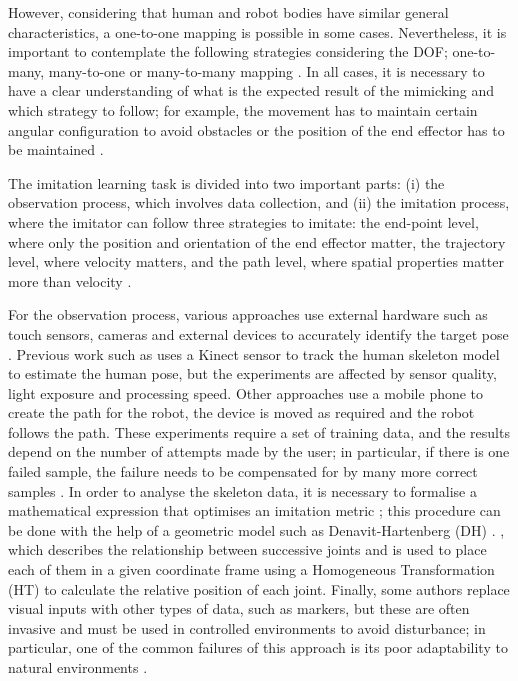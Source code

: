 \documentclass[thesis]{mas_proposal}
\begin{document}
		However, considering that human and robot bodies have similar general characteristics, a one-to-one mapping is possible in some cases. Nevertheless, it is important to contemplate the following strategies considering the DOF; one-to-many, many-to-one or many-to-many mapping \cite{Alissandrakis2007}. In all cases, it is necessary to have a clear understanding of what is the expected result of the mimicking and which strategy to follow; for example, the movement has to maintain certain angular configuration to avoid obstacles or the position of the end effector has to be maintained \cite{Bandera2010, Shin2001}.
		
		The imitation learning task is divided into two important parts: (i) the observation process, which involves data collection, and (ii) the imitation process, where the imitator can follow three strategies to imitate: the end-point level, where only the position and orientation of the end effector matter, the trajectory level, where velocity matters, and the path level, where spatial properties matter more than velocity \cite{Alissandrakis2002}.
		
		For the observation process, various approaches use external hardware such as touch sensors, cameras and external devices to accurately identify the target pose \cite{Hua2021}. Previous work such as \cite{Itauma2012, Liu2015} uses a Kinect sensor to track the human skeleton model to estimate the human pose, but the experiments are affected by sensor quality, light exposure and processing speed. Other approaches use a mobile phone to create the path for the robot, the device is moved as required and the robot follows the path. These experiments require a set of training data, and the results depend on the number of attempts made by the user; in particular, if there is one failed sample, the failure needs to be compensated for by many more correct samples \cite{Mandlekar2018}. In order to analyse the skeleton data, it is necessary to formalise a mathematical expression that optimises an imitation metric \cite{Billard2004}; this procedure can be done with the help of a geometric model such as Denavit-Hartenberg (DH) \cite{Fadli2018}. \cite{Assad2020} \cite{VanPerre2015}, which describes the relationship between successive joints and is used to place each of them in a given coordinate frame using a Homogeneous Transformation (HT) to calculate the relative position of each joint. Finally, some authors replace visual inputs with other types of data, such as markers, but these are often invasive and must be used in controlled environments to avoid disturbance; in particular, one of the common failures of this approach is its poor adaptability to natural environments \cite{Mohammad2009, Dillmann2004}.
		
\end{document}
